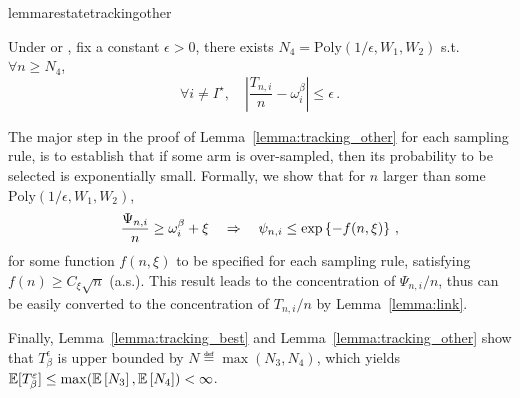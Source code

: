 \begin{restatable}{lemma}{restatetrackingother}\label{lemma:tracking_other}
\begin{leftbar}[lemmabar]
    Under \TTTS or \TCC, fix a constant $\epsilon > 0$, there exists $N_4 = \text{Poly}(1/\epsilon,W_1,W_2)$ s.t. $\forall n \geq N_4$,
    \[
        \forall i\neq I^\star, \quad \left|\frac{T_{n,i}}{n} - \omega_i^\beta\right| \leq \epsilon\,. 
    \]
\end{leftbar}
\end{restatable}

The major step in the proof of Lemma~\ref{lemma:tracking_other} for each sampling rule, is to establish that if some arm is over-sampled, then its probability to be selected is exponentially small. Formally, we show that for $n$ larger than some $\text{Poly}(1/\epsilon,W_1,W_2)$,
\[
    \frac{\Psi_{n,i}}{n} \geq \omega_{i}^\beta + \xi \ \ \ \Rightarrow \ \ \ \psi_{n,i} \leq \exp\left\{- f(n,\xi)\right\}\,,
\]
for some function $f(n,\xi)$ to be specified for each sampling rule, satisfying $f(n)\geq C_\xi\sqrt{n}$ (a.s.). This result leads to the concentration of $\Psi_{n,i}/n$, thus can be easily converted to the concentration of $T_{n,i}/n$ by Lemma~\ref{lemma:link}.


Finally, Lemma~\ref{lemma:tracking_best} and Lemma~\ref{lemma:tracking_other} show that $T_\beta^\epsilon$ is upper bounded by $N \eqdef \max(N_3,N_4)$, which yields $\mathbb{E}[{T_\beta^\varepsilon}] \leq \max(\mathbb{E}\left[N_3\right],\mathbb{E}\left[N_4\right]) < \infty$.
